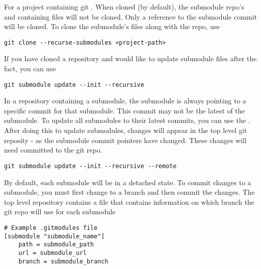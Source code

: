 \myindent For a project containing git . When cloned (by default), the submodule repo's and containing files will not be cloned. Only a reference to the submodule commit will be cloned. To clone the submodule's files along with the repo, use
\begin{lstlisting}
git clone --recurse-submodules <project-path>
\end{lstlisting}

If you have cloned a repository and would like to update submodule files after the fact, you can use
\begin{lstlisting}
git submodule update --init --recursive
\end{lstlisting}

In a repository containing a submodule, the submodule is always pointing to a specific commit for that submodule. This commit may not be the latest of the submodule. To update all submodules to their latest commits, you can use the . After doing this to update submodules, changes will appear in the top level git reposity - as the submodule commit pointers have changed. These changes will need committed to the git repo.
\begin{lstlisting}
git submodule update --init --recursive --remote
\end{lstlisting}

By default, each submodule will be in a detached  state. To commit changes to a submodule, you must first change to a branch and then commit the changes. The top level repository contains a  file that contains information on which branch the git repo will use for each submodule
\begin{lstlisting}
# Example .gitmodules file
[submodule "submodule_name"]
    path = submodule_path
    url = submodule_url
    branch = submodule_branch
\end{lstlisting}